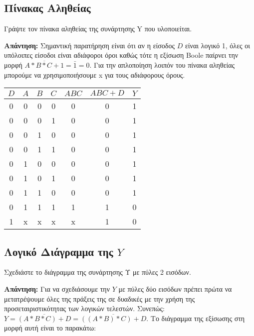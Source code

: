 \documentclass[]{article}
\begin{document}
\newpage
\subsection{Πίνακας Αληθείας}
Γράψτε τον πίνακα αληθείας της συνάρτησης Y που υλοποιείται.

\textbf{Απάντηση: }
Σημαντική παρατήρηση είναι ότι αν η είσοδος $D$ είναι λογικό 1, όλες οι υπόλοιπες είσοδοι είναι αδιάφοροι όροι καθώς τότε η εξίσωση Boole παίρνει την μορφή $\overline{A * B * C + 1} = \bar{1} = 0$.
Για την απλοποίηση λοιπόν του πίνακα αληθείας μπορούμε να χρησιμοποιήσουμε x για τους αδιάφορους όρους.
\begin{center}
	\begin{tabular}{ | c | c | c | c | c | c | c | }
		\hline $D$ & $A$ & $B$ & $C$ & $ABC$ & $ABC + D$ & $Y$ \\
		\hline 0   & 0   & 0   & 0   & 0     & 0         & 1   \\
		0          & 0   & 0   & 1   & 0     & 0         & 1   \\
		0          & 0   & 1   & 0   & 0     & 0         & 1   \\
		0          & 0   & 1   & 1   & 0     & 0         & 1   \\
		0          & 1   & 0   & 0   & 0     & 0         & 1   \\
		0          & 1   & 0   & 1   & 0     & 0         & 1   \\
		0          & 1   & 1   & 0   & 0     & 0         & 1   \\
		0          & 1   & 1   & 1   & 1     & 1         & 0   \\
		1          & x   & x   & x   & x     & 1         & 0   \\
		\hline
	\end{tabular}
\end{center}

\subsection{Λογικό Διάγραμμα της $Y$}
Σχεδιάστε το διάγραμμα της συνάρτησης Υ με πύλες 2 εισόδων.

\textbf{Απάντηση: } Για να σχεδιάσουμε την $Y$ με πύλες δύο εισόδων πρέπει πρώτα να μετατρέψουμε όλες της πράξεις της σε δυαδικές με την χρήση της προσεταιριστικότητας των λογικών τελεστών.
Συνεπώς: $Y = \overline{(A * B * C) + D} = \overline{((A * B) * C) + D}$.
Το διάγραμμα της εξίσωσης στη μορφή αυτή είναι το παρακάτω:
\end{document}
